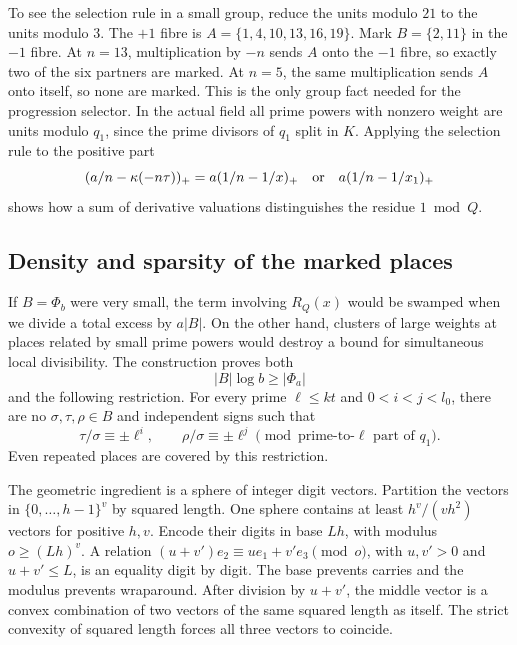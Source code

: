 To see the selection rule in a small group, reduce the units modulo \(21\) to the units modulo \(3\). The \(+1\) fibre is \(A=\{1,4,10,13,16,19\}\). Mark \(B=\{2,11\}\) in the \(-1\) fibre. At \(n=13\), multiplication by \(-n\) sends \(A\) onto the \(-1\) fibre, so exactly two of the six partners are marked. At \(n=5\), the same multiplication sends \(A\) onto itself, so none are marked. This is the only group fact needed for the progression selector. In the actual field all prime powers with nonzero weight are units modulo \(q_1\), since the prime divisors of \(q_1\) split in \(K\). Applying the selection rule to the positive part
\[
       (a/n-\kappa(-n\tau))_+
       =a(1/n-1/x)_+\quad\hbox{or}\quad a(1/n-1/x_1)_+
\]
shows how a sum of derivative valuations distinguishes the residue \(1\bmod Q\).

\subsection{Density and sparsity of the marked places}
If \(B=\Phi_b\) were very small, the term involving \(R_Q(x)\) would be swamped when we divide a total excess by \(a|B|\). On the other hand, clusters of large weights at places related by small prime powers would destroy a bound for simultaneous local divisibility. The construction proves both
\[
        |B|\log b\ge|\Phi_a|
\]
and the following restriction. For every prime \(\ell\le kt\) and \(0<i<j<l_0\), there are no \(\sigma,\tau,\rho\in B\) and independent signs such that
\[
 \tau/\sigma\equiv\pm\ell^i,\qquad
 \rho/\sigma\equiv\pm\ell^j
 \pmod{\text{prime-to-}\ell\text{ part of }q_1}.
\]
Even repeated places are covered by this restriction.

The geometric ingredient is a sphere of integer digit vectors. Partition the vectors in \(\{0,\ldots,h-1\}^{v}\) by squared length. One sphere contains at least \(h^v/(vh^2)\) vectors for positive \(h,v\). Encode their digits in base \(Lh\), with modulus \(o\ge(Lh)^v\). A relation
\((u+v')e_2\equiv u e_1+v'e_3\pmod o\), with \(u,v'>0\) and \(u+v'\le L\), is an equality digit by digit. The base prevents carries and the modulus prevents wraparound. After division by \(u+v'\), the middle vector is a convex combination of two vectors of the same squared length as itself. The strict convexity of squared length forces all three vectors to coincide.

